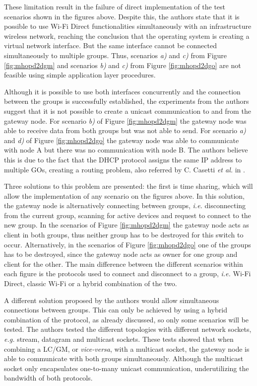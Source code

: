 These limitation result in the failure of direct implementation of the test scenarios shown in the figures above. Despite this, the authors state that it is possible to use Wi-Fi Direct functionalities simultaneously with an infrastructure wireless network, reaching the conclusion that the operating system is creating a virtual network interface. But the same interface cannot be connected simultaneously to multiple groups. Thus, scenarios \textit{a)} and \textit{c)} from Figure \ref{fig:mhopd2dgm} and scenarios \textit{b)} and \textit{c)} from Figure \ref{fig:mhopd2dgo} are not feasible using simple application layer procedures.

Although it is possible to use both interfaces concurrently and the connection between the groups is successfully established, the experiments from the authors suggest that it is not possible to create a unicast communication to and from the gateway node. For scenario \textit{b)} of Figure \ref{fig:mhopd2dgm} the gateway node was able to receive data from both groups but was not able to send. For scenario \textit{a)} and \textit{d)} of Figure \ref{fig:mhopd2dgo} the gateway node was able to communicate with node A but there was no communication with node B. The authors believe this is due to the fact that the \gls{DHCP} protocol assigns the same \gls{IP} address to multiple \glspl{GO}, creating a routing problem, also referred by C. Casetti \textit{et al.} in \cite{routeMultiGroup}.

Three solutions to this problem are presented: the first is time sharing, which will allow the implementation of any scenario on the figures above. In this solution, the gateway node is alternatively connecting between groups, \textit{i.e.} disconnecting from the current group, scanning for active devices and request to connect to the new group. In the scenarios of Figure \ref{fig:mhopd2dgm} the gateway node acts as client in both groups, thus neither group has to be destroyed for this switch to occur. Alternatively, in the scenarios of Figure \ref{fig:mhopd2dgo} one of the groups has to be destroyed, since the gateway node acts as owner for one group and client for the other. The main difference between the different scenarios within each figure is the protocols used to connect and disconnect to a group, \textit{i.e.} Wi-Fi Direct, classic Wi-Fi or a hybrid combination of the two.

A different solution proposed by the authors would allow simultaneous connections between groups. This can only be achieved by using a hybrid combination of the protocol, as already discussed, so only some scenarios will be tested. The authors tested the different topologies with different network sockets, \textit{e.g.} stream, datagram and multicast sockets. These tests showed that when combining a LC/GM, or \textit{vice-versa}, with a multicast socket, the gateway node is able to communicate with both groups simultaneously. Although the multicast socket only encapsulates one-to-many unicast communication, underutilizing the bandwidth of both protocols.

